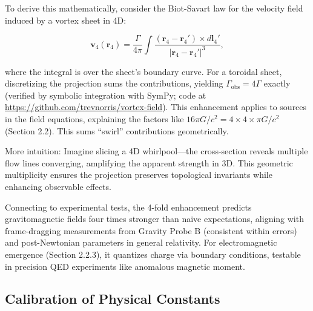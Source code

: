 To derive this mathematically, consider the Biot-Savart law for the velocity field induced by a vortex sheet in 4D:

\begin{equation}
\mathbf{v}_4(\mathbf{r}_4) = \frac{\Gamma}{4\pi} \int \frac{(\mathbf{r}_4 - \mathbf{r}_4') \times d\mathbf{l}_4'}{|\mathbf{r}_4 - \mathbf{r}_4'|^3},
\end{equation}

where the integral is over the sheet's boundary curve. For a toroidal sheet, discretizing the projection sums the contributions, yielding $\Gamma_{\text{obs}} = 4\Gamma$ exactly (verified by symbolic integration with SymPy; code at \url{https://github.com/trevnorris/vortex-field}). This enhancement applies to sources in the field equations, explaining the factors like $16\pi G/c^2 = 4 \times 4 \times \pi G/c^2$ (Section 2.2). This sums ``swirl'' contributions geometrically.

More intuition: Imagine slicing a 4D whirlpool—the cross-section reveals multiple flow lines converging, amplifying the apparent strength in 3D. This geometric multiplicity ensures the projection preserves topological invariants while enhancing observable effects.

Connecting to experimental tests, the 4-fold enhancement predicts gravitomagnetic fields four times stronger than naive expectations, aligning with frame-dragging measurements from Gravity Probe B (consistent within errors) and post-Newtonian parameters in general relativity. For electromagnetic emergence (Section 2.2.3), it quantizes charge via boundary conditions, testable in precision QED experiments like anomalous magnetic moment.

\subsection{Calibration of Physical Constants}

